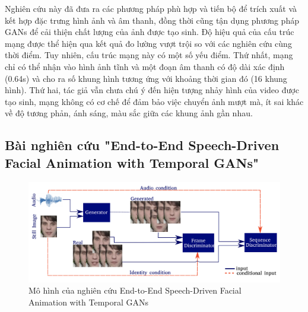Nghiên cứu này đã đưa ra các phương pháp phù hợp và tiến bộ để trích xuất và kết hợp đặc trưng hình ảnh và âm thanh, đồng thời cũng tận dụng phương pháp GANs để cải thiện chất lượng của ảnh được tạo sinh. Độ hiệu quả của cấu trúc mạng được thể hiện qua kết quả đo lường vượt trội so với các nghiên cứu cùng thời điểm. Tuy nhiên, cấu trúc mạng này có một số yếu điểm. Thứ nhất, mạng chỉ có thể nhận vào hình ảnh tĩnh và một đoạn âm thanh có độ dài xác định (0.64s) và cho ra số khung hình tương ứng với khoảng thời gian đó (16 khung hình). Thứ hai, tác giả vẫn chưa chú ý đến hiện tượng nhảy hình của video được tạo sinh, mạng không có cơ chế để đảm bảo việc chuyển ảnh mượt mà, ít sai khác về độ tương phản, ánh sáng, màu sắc giữa các khung ảnh gần nhau.


\subsection{\texorpdfstring{Bài nghiên cứu "End-to-End Speech-Driven Facial Animation with Temporal GANs"\cite{vougioukas2019}}{Target}}
\label{sec:vougioukas2019}

\begin{figure}[H]
    \centering
    \includegraphics[width=15cm]{./content/images/vou2019_model.png}
    \caption{Mô hình của nghiên cứu End-to-End Speech-Driven Facial Animation with Temporal GANs}
    \label{fig:vou2019_model}
\end{figure}

